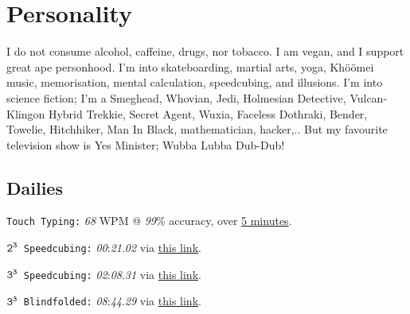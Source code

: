 \documentclass[12pt,a4paper,oneside]{article}
\begin{document}
\section{Personality}
I do not consume alcohol, caffeine, drugs, nor tobacco.
I am vegan, and I support great ape personhood.
I'm into skateboarding, martial arts, yoga, Khöömei music, memorisation, mental calculation, speedcubing, and illusions.
I'm into science fiction; I'm a Smeghead, Whovian, Jedi, Holmesian Detective, Vulcan-Klingon Hybrid Trekkie, Secret Agent, Wuxia, Faceless Dothraki, Bender, Towelie, Hitchhiker, Man In Black, mathematician, hacker,.. But my favourite television show is Yes Minister; Wubba Lubba Dub-Dub!%

\subsection{Dailies}
\item \texttt{Touch Typing\phantom{ng}:} \textit{68} WPM @ \textit{99}\% accuracy, over \href{https://www.typing.com/student/test/5}{5 minutes}.%
\item \texttt{$\text{\texttt{2}}^\text{\texttt{3}}$ Speedcubing:} \textit{00}:\textit{21}.\textit{02} via \href{http://www.cubetimer.com/}{this link}.
\item \texttt{$\text{\texttt{3}}^\text{\texttt{3}}$ Speedcubing:} \textit{02}:\textit{08}.\textit{31} via \href{http://www.cubetimer.com/}{this link}.
\item \texttt{$\text{\texttt{3}}^\text{\texttt{3}}$ Blindfolded:} \textit{08}:\textit{44}.\textit{29} via \href{http://www.cubetimer.com/}{this link}.
\end{document}
